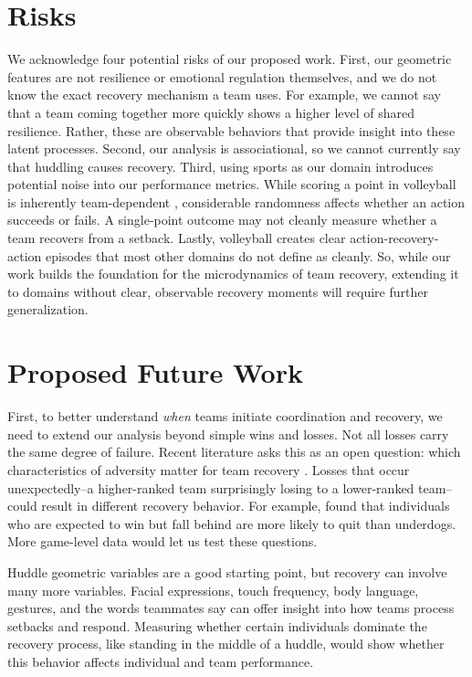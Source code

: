 \documentclass[12pt]{article}          %
\begin{document}
\section{Risks}
We acknowledge four potential risks of our proposed work. First, our geometric features are not resilience or emotional regulation themselves, and we do not know the exact recovery mechanism a team uses. For example, we cannot say that a team coming together more quickly shows a higher level of shared resilience. Rather, these are observable behaviors that provide insight into these latent processes. Second, our analysis is associational, so we cannot currently say that huddling causes recovery. Third, using sports as our domain introduces potential noise into our performance metrics. While scoring a point in volleyball is inherently team-dependent \citep{EomSchutz}, considerable randomness affects whether an action succeeds or fails. A single-point outcome may not cleanly measure whether a team recovers from a setback. Lastly, volleyball creates clear action-recovery-action episodes that most other domains do not define as cleanly. So, while our work builds the foundation for the microdynamics of team recovery, extending it to domains without clear, observable recovery moments will require further generalization. 



\section{Proposed Future Work}
First, to better understand \textit{when} teams initiate coordination and recovery, we need to extend our analysis beyond simple wins and losses. Not all losses carry the same degree of failure. Recent literature asks this as an open question: which characteristics of adversity matter for team recovery \citep{bisbey2025towards}. Losses that occur unexpectedly–a higher-ranked team surprisingly losing to a lower-ranked team–could result in different recovery behavior. For example, \citet{dai2018quitting} found that individuals who are expected to win but fall behind are more likely to quit than underdogs. More game-level data would let us test these questions.

Huddle geometric variables are a good starting point, but recovery can involve many more variables. Facial expressions, touch frequency, body language, gestures, and the words teammates say can offer insight into how teams process setbacks and respond. Measuring whether certain individuals dominate the recovery process, like standing in the middle of a huddle, would show whether this behavior affects individual and team performance.
\end{document}
